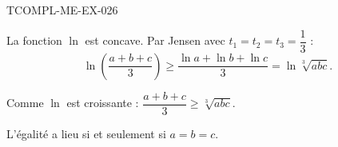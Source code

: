 \begin{corrige}{TCOMPL-ME-EX-026}

La fonction $\ln$ est concave. Par Jensen avec $t_1=t_2=t_3=\dfrac{1}{3}$ :
\[ \ln\!\left(\frac{a+b+c}{3}\right) \geq \frac{\ln a + \ln b + \ln c}{3} = \ln\sqrt[3]{abc}. \]


Comme $\ln$ est croissante : $\dfrac{a+b+c}{3} \geq \sqrt[3]{abc}$.

L'égalité a lieu si et seulement si $a = b = c$.

\end{corrige}
